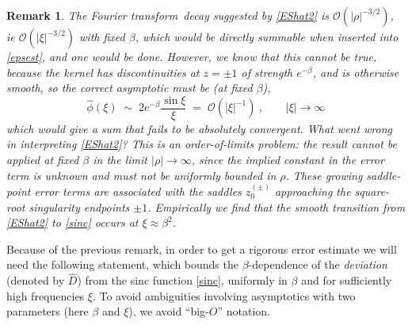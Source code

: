 \documentclass[10pt]{article}
\newcommand{\be}{\begin{equation}}
\newcommand{\ee}{\end{equation}}
\newcommand{\bigO}{{\mathcal O}}
\newtheorem{rmk}[thm]{Remark}
\newcommand{\freq}{\beta}          %
\newcommand{\FT}{Fourier transform}
\begin{document}
\begin{rmk}
The \FT\ decay suggested by \eqref{EShat2} is $\bigO(|\rho|^{-3/2})$,
ie $\bigO(|\xi|^{-3/2})$ with fixed $\freq$,
which would be directly summable when inserted into \eqref{epsest},
and one would be done.
However, we know that this cannot be true,
because the kernel has discontinuities at $z=\pm 1$ of strength $e^{-\freq}$,
and is otherwise smooth, so
the correct asymptotic must be (at fixed $\freq$),
\be
\hat\phi(\xi) \;\sim\; 2 e^{-\freq} \frac{\sin \xi}{\xi} \;=\; \bigO(|\xi|^{-1})
~, \qquad |\xi|\to\infty
\label{sinc}
\ee
which would give a sum that fails to be absolutely convergent.
What went wrong in interpreting \eqref{EShat2}?
This is an order-of-limits problem:
the result cannot be applied at fixed $\freq$
in the limit $|\rho|\to\infty$, since the implied constant in the error
term is unknown and must not be uniformly bounded in $\rho$.
These growing saddle-point
error terms are associated with the saddles $z_0^{(\pm)}$ approaching
the square-root singularity endpoints $\pm1$.
Empirically we find that the smooth
transition from \eqref{EShat2} to \eqref{sinc} occurs at $\xi\approx\freq^2$.
\label{r:decay}
\end{rmk}

Because of the previous remark, in order to get a rigorous error estimate
we will need the following statement, which
bounds the $\freq$-dependence of the {\em deviation} (denoted by $\hat D$)
from the sinc function
\eqref{sinc}, uniformly in $\freq$ and for sufficiently high frequencies $\xi$.
To avoid ambiguities involving asymptotics with two parameters
(here $\freq$ and $\xi$), we avoid ``big-$O$'' notation.
\end{document}
